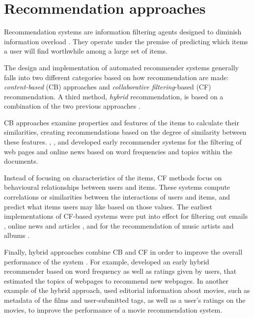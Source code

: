\section{Recommendation approaches}\label{sec:4-recommendation-approaches}
Recommendation systems are information filtering agents designed to diminish information overload \autocite{good99combining}. They  operate under the premise of predicting which items a user will find worthwhile among a large set of items. 

The design and implementation of automated recommender systems generally falls into two different categories based on how recommendation are made:
\emph{content-based} (CB) approaches and \emph{collaborative filtering}-based (CF) recommendation. 
A third method, \emph{hybrid} recommendation,  is based on a combination of the two previous approaches \autocite{balabanovic97fab, adomavicius05toward}. 

CB approaches examine properties and features of the items to calculate their similarities, creating recommendations based on the degree of similarity between these features. 
\textcite{lang95newsweeder}, \textcite{pazzani96syskill}, and \textcite{chen98webmate} developed early recommender systems for the filtering of web pages and online news based on word frequencies and topics within the documents.

Instead of focusing on characteristics of the items, CF methods focus on behavioural relationships between users and items. These systems compute correlations or similarities between the interactions of users and items, and predict what items users may like based on those values. 
The earliest implementations of CF-based systems were put into effect for filtering out emails \autocite{goldberg92using}, online news and articles \autocite{resnick94grouplens}, and for the recommendation of music artists and albums \autocite{shardanand95social}.

Finally, hybrid approaches combine CB and CF in order to improve the overall performance of the  system \autocite{burke02hybrid}. 
For example, \textcite{balabanovic97fab} developed an early hybrid recommender based on word frequency as well as ratings given by users, that estimated the topics of webpages to recommend new webpages. 
In another example of the hybrid approach, \textcite{basu98recommendation} used editorial information about movies, such as metadata of the films and user-submitted tags, as well as a user's ratings on the movies, to improve the performance of a movie recommendation system.

